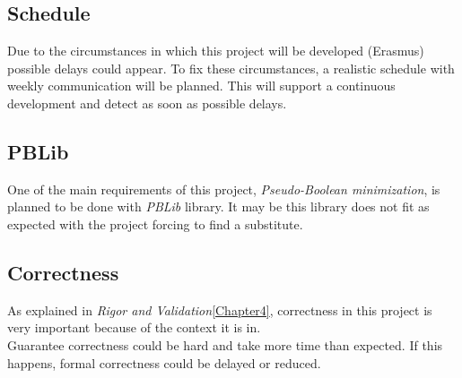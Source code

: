 \subsection{Schedule}
Due to the circumstances in which this project will be developed (Erasmus) possible delays could appear. To fix these circumstances, a realistic schedule with weekly communication will be planned. This will support a continuous development and detect as soon as possible delays. 

\subsection{PBLib}
One of the main requirements of this project, \emph{Pseudo-Boolean minimization}, is planned to be done with \emph{PBLib} library. It may be this library does not fit as expected with the project forcing to find a substitute. 

\subsection{Correctness}
As explained in \emph{Rigor and Validation}\ref{Chapter4}, correctness in this project is very important because of the context it is in. \\
Guarantee correctness could be hard and take more time than expected. If this happens, formal correctness could be delayed or reduced. 